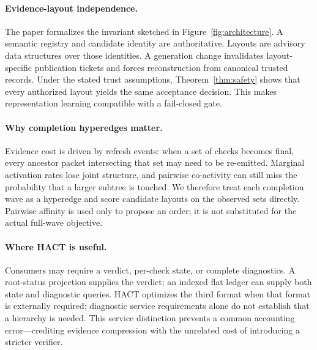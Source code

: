 \documentclass[11pt]{article}
\theoremstyle{definition}\newtheorem{definition}[theorem]{Definition}
\begin{document}
\paragraph{Evidence-layout independence.}
The paper formalizes the invariant sketched in Figure~\ref{fig:architecture}. A semantic registry and candidate identity are authoritative. Layouts are advisory data structures over those identities. A generation change invalidates layout-specific publication tickets and forces reconstruction from canonical trusted records. Under the stated trust assumptions, Theorem~\ref{thm:safety} shows that every authorized layout yields the same acceptance decision. This makes representation learning compatible with a fail-closed gate.

\paragraph{Why completion hyperedges matter.}
Evidence cost is driven by refresh events: when a set of checks becomes final, every ancestor packet intersecting that set may need to be re-emitted. Marginal activation rates lose joint structure, and pairwise co-activity can still miss the probability that a larger subtree is touched. We therefore treat each completion wave as a hyperedge and score candidate layouts on the observed sets directly. Pairwise affinity is used only to propose an order; it is not substituted for the actual full-wave objective.

\paragraph{Where HACT is useful.}
Consumers may require a verdict, per-check state, or complete diagnostics. A root-status projection supplies the verdict; an indexed flat ledger can supply both state and diagnostic queries. HACT optimizes the third format when that format is externally required; diagnostic service requirements alone do not establish that a hierarchy is needed. This service distinction prevents a common accounting error---crediting evidence compression with the unrelated cost of introducing a stricter verifier.
\end{document}

